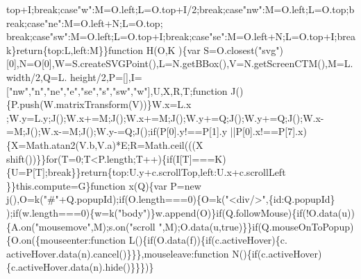 \begin{DoxyCode}
{      top+I;\textcolor{keywordflow}{break};\textcolor{keywordflow}{case}\textcolor{stringliteral}{"w"}:M=O.left;L=O.top+I/2;\textcolor{keywordflow}{break};\textcolor{keywordflow}{case}\textcolor{stringliteral}{"nw"}:M=O.left;L=O.top;\textcolor{keywordflow}{break};\textcolor{keywordflow}{case}\textcolor{stringliteral}{"ne"}:M=O.left+N;L=O.top;\textcolor{keywordflow}{
      break};\textcolor{keywordflow}{case}\textcolor{stringliteral}{"sw"}:M=O.left;L=O.top+I;\textcolor{keywordflow}{break};\textcolor{keywordflow}{case}\textcolor{stringliteral}{"se"}:M=O.left+N;L=O.top+I;\textcolor{keywordflow}{break}\}\textcolor{keywordflow}{return}\{top:L,left:M\}\}\textcolor{keyword}{function} H(O,K
      )\{var S=O.closest(\textcolor{stringliteral}{"svg"})[0],N=O[0],W=S.createSVGPoint(),L=N.getBBox(),V=N.getScreenCTM(),M=L.width/2,Q=L.
      height/2,P=[],I=[\textcolor{stringliteral}{"nw"},\textcolor{stringliteral}{"n"},\textcolor{stringliteral}{"ne"},\textcolor{stringliteral}{"e"},\textcolor{stringliteral}{"se"},\textcolor{stringliteral}{"s"},\textcolor{stringliteral}{"sw"},\textcolor{stringliteral}{"w"}],U,X,R,T;\textcolor{keyword}{function} J()\{P.push(W.matrixTransform(V))\}W.x=L.x
      ;W.y=L.y;J();W.x+=M;J();W.x+=M;J();W.y+=Q;J();W.y+=Q;J();W.x-=M;J();W.x-=M;J();W.y-=Q;J();\textcolor{keywordflow}{if}(P[0].y!==P[1].y
      ||P[0].x!==P[7].x)\{X=Math.atan2(V.b,V.a)*E;R=Math.ceil(((X%
      shift())\}\}\textcolor{keywordflow}{for}(T=0;T<P.length;T++)\{\textcolor{keywordflow}{if}(I[T]===K)\{U=P[T];\textcolor{keywordflow}{break}\}\}\textcolor{keywordflow}{return}\{top:U.y+c.scrollTop,left:U.x+c.scrollLeft
      \}\}this.compute=G\}\textcolor{keyword}{function} x(Q)\{var P=\textcolor{keyword}{new} j(),O=k(\textcolor{stringliteral}{"#"}+Q.popupId);\textcolor{keywordflow}{if}(O.length===0)\{O=k(\textcolor{stringliteral}{"<div/>"},\{\textcolor{keywordtype}{id}:Q.popupId\}
      );\textcolor{keywordflow}{if}(w.length===0)\{w=k(\textcolor{stringliteral}{"body"})\}w.append(O)\}\textcolor{keywordflow}{if}(Q.followMouse)\{\textcolor{keywordflow}{if}(!O.data(u))\{A.on(\textcolor{stringliteral}{"mousemove"},M);s.on(\textcolor{stringliteral}{"scroll
      "},M);O.data(u,\textcolor{keyword}{true})\}\}\textcolor{keywordflow}{if}(Q.mouseOnToPopup)\{O.on(\{mouseenter:\textcolor{keyword}{function} L()\{\textcolor{keywordflow}{if}(O.data(f))\{\textcolor{keywordflow}{if}(c.activeHover)\{c.
      activeHover.data(n).cancel()\}\}\},mouseleave:\textcolor{keyword}{function} N()\{\textcolor{keywordflow}{if}(c.activeHover)\{c.activeHover.data(n).hide()\}\}\})\}\textcolor{keyword}{
}}
\end{DoxyCode}
